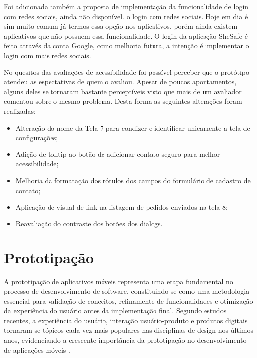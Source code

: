 Foi adicionada também a proposta de implementação da funcionalidade de login com redes sociais, ainda não disponível. o login com redes sociais. Hoje em dia é sim muito comum já termos essa opção nos aplicativos, porém ainda existem aplicativos que não possuem essa funcionalidade. O login da aplicação SheSafe é feito através da conta Google, como melhoria futura, a intenção é implementar o login com mais redes sociais.

No quesitos das avaliações de acessibilidade foi possível perceber que o protótipo atendeu as espectativas de quem o avaliou. Apesar de poucos apontamentos, alguns deles se tornaram bastante perceptíveis visto que mais de um avaliador comentou sobre o mesmo problema. Desta forma as seguintes alterações foram realizadas:

\begin{itemize}
\item Alteração do nome da Tela 7 para condizer e identificar unicamente a tela de configurações;
\item Adição de tolltip ao botão de adicionar contato seguro para melhor acessibilidade;
\item Melhoria da formatação dos rótulos dos campos do formulário de cadastro de contato;
\item Aplicação de visual de link na listagem de pedidos enviados na tela 8;
\item Reavaliação do contraste dos botões dos dialogs.
\end{itemize}

\section{Prototipação}

A prototipação de aplicativos móveis representa uma etapa fundamental no processo de desenvolvimento de software, constituindo-se como uma metodologia essencial para validação de conceitos, refinamento de funcionalidades e otimização da experiência do usuário antes da implementação final. Segundo estudos recentes, a experiência do usuário, interação usuário-produto e produtos digitais tornaram-se tópicos cada vez mais populares nas disciplinas de design nos últimos anos, evidenciando a crescente importância da prototipação no desenvolvimento de aplicações móveis \cite{sciencedirect_design_approaches}.

